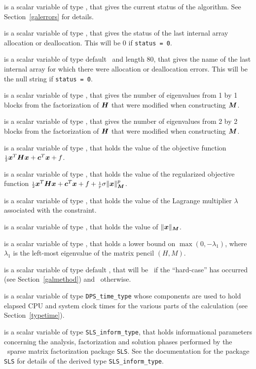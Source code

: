 \documentclass{galahad}
\newcommand{\packagename}{DPS}
\begin{document}
\begin{description}
 is a scalar variable of type \integer, that gives the
current status of the algorithm. See Section~\ref{galerrors} for details.

 is a scalar variable of type \integer,
that gives the status of the last internal array allocation
or deallocation. This will be 0 if {\tt status = 0}.

 is a scalar variable of type default \character\
and length 80, that  gives the name of the last internal array
for which there were allocation or deallocation errors.
This will be the null string if {\tt status = 0}.

 is a scalar variable of type \integer,
that gives the number of eigenvalues from 1 by 1 blocks from the
factorization of ${\bm{H}}$ that were modified when constructing ${\bm{M}}$.

 is a scalar variable of type \integer,
that gives the number of eigenvalues from 2 by 2 blocks from the
factorization of ${\bm{H}}$ that were modified when constructing ${\bm{M}}$.

 is a scalar variable of type \realdp, that holds the
value of the objective function ${\scriptstyle \frac{1}{2}} {\bm{x}}^T {\bm{H}} {\bm{x}}  +  {\bm{c}}^T {\bm{x}} + f$.

 is a scalar variable of type \realdp, that
holds the value of the regularized objective function ${\scriptstyle \frac{1}{2}} {\bm{x}}^T {\bm{H}} {\bm{x}}
 + {\bm{c}}^T {\bm{x}} + f + {\scriptstyle \frac{1}{p}} \sigma \|{\bm{x}}\|_{{\bm{M}}}^p$.

 is a scalar variable of type \realdp, that holds the
value of the Lagrange multiplier $\lambda$ associated with the constraint.

 is a scalar variable of type \realdp,
that holds the value of $\|{\bm{x}}\|_{{\bm{M}}}$.

 is a scalar variable of type \realdp, that holds a lower
bound on $\max(0,-\lambda_1)$, where $\lambda_1$ is the left-most eigenvalue of
the matrix pencil $(H,M)$.

 is a scalar variable of type default \logical, that will be
\true\ if the ``hard-case'' has occurred (see Section~\ref{galmethod})
and \false\ otherwise.

 is a scalar variable of type {\tt \packagename\_time\_type}
whose components are used to hold elapsed CPU  and system clock times for the
various parts of the calculation (see Section~\ref{typetime}).

 is a scalar variable of type {\tt SLS\_inform\_type},
that holds informational parameters concerning the analysis, factorization
and solution phases performed by
the \galahad\ sparse matrix factorization package {\tt SLS}.
See the documentation for the package {\tt SLS} for details of the
derived type {\tt SLS\_inform\_type}.

\end{description}
\end{document}
